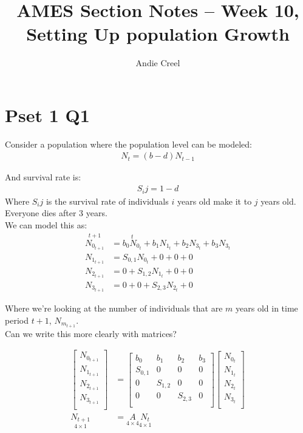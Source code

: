 \documentclass{article}
\title{AMES Section Notes -- Week 10, Setting Up population Growth}
\author{Andie Creel}
\begin{document}
\maketitle



\section{Pset 1 Q1}
Consider a population where the population level can be modeled: 
\begin{align}
    N_t = (b-d)N_{t-1}
\end{align}

And survival rate is:
\begin{align}
    S_ij = 1 -d
\end{align}
Where $S_ij$ is the survival rate of individuals $i$ years old make it to $j$ years old.\\

Everyone dies after 3 years. \\

We can model this as:
\begin{align}
    \overset{t+1}{N_{0_{t+1}}} &= \overset{t}{b_0 N_{0_t}} + b_1  N_{1_t}+ b_2  N_{3_t} + b_3  N_{3_t}\\
    N_{1_{t+1}} &= S_{0,1} N_{0_t} + 0 + 0 + 0\\
    N_{2_{t+1}} &= 0+ S_{1,2} N_{1_t}+ 0 + 0\\
    N_{3_{t+1}} &= 0 + 0 + S_{2,3} N_{2_t} + 0
\end{align}

Where we're looking at the number of individuals that are $m$ years old in time period $t+1$, $N_{m_{t+1}}$.\\

Can we write this more clearly with matrices?

\begin{align}
    \begin{bmatrix}
        N_{0_{t+1}}\\
        N_{1_{t+1}} \\
        N_{2_{t+1}} \\
        N_{3_{t+1}}\\
    \end{bmatrix} &= 
    \begin{bmatrix}
        b_0 & b_1 & b_2 & b_3\\
        S_{0,1} & 0 & 0 &0 \\
        0 & S_{1,2} & 0 &0 \\
        0 & 0 & S_{2,3} &0 \\
    \end{bmatrix}
    \begin{bmatrix}
        N_{0_{t}}\\
        N_{1_{t}} \\
        N_{2_{t}} \\
        N_{3_{t}}\\
    \end{bmatrix} \\
    \underset{4 \times 1}{N_{t+1}} &= \underset{4 \times 4}{A} \underset{4 \times 1}{N_t}
\end{align}
\end{document}
